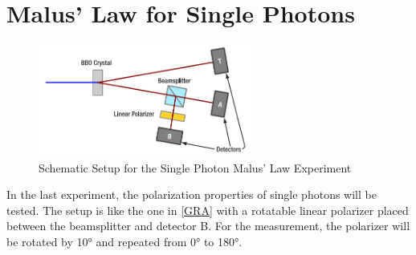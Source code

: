 \section{Malus’ Law for Single Photons}
\begin{figure}[H]
    \centering
    \includegraphics[width=70mm,scale=0.5]{Quantenoptik/include/A5.PNG}
    \caption{Schematic Setup for the Single Photon Malus’ Law Experiment}
    \label{fig:A5}
\end{figure} 
In the last experiment, the polarization properties of single photons will be tested. The setup is like the one in \ref{GRA} with a rotatable linear polarizer placed between the beamsplitter and detector B. For the measurement, the polarizer will be rotated by 10° and repeated from 0° to 180°. 
